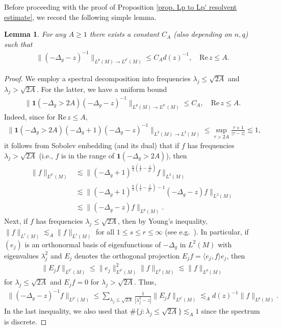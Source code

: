 \documentclass[12pt]{amsart}
\newcommand\re{\mathrm{Re}\,}
\newtheorem{lemma}[theorem]{Lemma}
\begin{document}
 Before proceeding with the proof of Proposition \ref{prop. Lp to Lp' resolvent estimate}, we record the following simple lemma. 


\begin{lemma}\label{lemma |z|<A}
For any $A\geq 1$ there exists a constant $C_A$ (also depending on $n,q$) such that
    \begin{align}
    \|(-\Delta_g-z)^{-1}\|_{L^{p}(M)\to L^{p'}(M)}\leq C_Ad(z)^{-1},\quad \re z\leq A.
\end{align}
\end{lemma}

\begin{proof}
    We employ a spectral decomposition into frequencies $\lambda_j\leq \sqrt{2A}$ and $\lambda_j>\sqrt{2A}$. For the latter, we have a uniform bound
\begin{align}
\|\mathbf{1}(-\Delta_g>2A)(-\Delta_g-z)^{-1}\|_{L^{p}(M)\to L^{p'}(M)}\leq C_A,\quad \re z\leq A.
\end{align}
Indeed, since for $\re z\leq A$,
\begin{align}
    \|\mathbf{1}(-\Delta_g>2A)(-\Delta_g+1)(-\Delta_g-z)^{-1}\|_{L^2(M)\to L^2(M)}\leq \sup_{\tau>2A}\frac{\tau+1}{|\tau-z|}\lesssim 1,
\end{align}
it follows from Sobolev embedding (and its dual)
that if $f$ has frequencies $\lambda_j>\sqrt{2A}$ (i.e., $f$ is in the range of $\mathbf{1}(-\Delta_g>2A)$), then
\begin{align}
 \|f\|_{L^{p'}(M)}
 &\lesssim \|(-\Delta_g+1)^{\frac{n}{2}(\frac{1}{2}-\frac{1}{p'})}f\|_{L^{2}(M)}\\
 &\lesssim \|(-\Delta_g+1)^{\frac{n}{2}(\frac{1}{2}-\frac{1}{p'})-1}(-\Delta_g-z)f\|_{L^{2}(M)}\\
 &\lesssim \|(-\Delta_g-z)f\|_{L^{p}(M)}.
\end{align}
Next, if $f$ has frequencies $\lambda_j\leq \sqrt{2A}$, then
by Young's inequality, $\|f\|_{L^r(M)}\lesssim_A \|f\|_{L^s(M)}$ for all $1\leq s\leq r\leq \infty$ (see e.g.\ \cite[Lemma 3.1]{MR3302640}). In particular, if $(e_j)$ is an orthonormal basis of eigenfunctions of $-\Delta_g$ in $L^2(M)$ with eigenvalues $\lambda_j^2$ and $E_j$ denotes the orthogonal projection $E_jf=\langle e_j,f\rangle e_j$, then
\begin{align}
    \|E_j f\|_{L^{p'}(M)}\leq \|e_j\|_{L^{p'}(M)}^2 \|f\|_{L^{p}(M)}\lesssim \|f\|_{L^{p}(M)}
\end{align}
for $\lambda_j\leq \sqrt{2A}$ and $E_jf=0$ for $\lambda_j>\sqrt{2A}$.
Thus,
\begin{align}
 \|(-\Delta_g-z)^{-1}f\|_{L^{p'}(M)}\leq \sum_{\lambda_j\leq \sqrt{2A}}\frac{1}{|\lambda_j^2-z|}\|E_j f\|_{L^{p'}(M)}\lesssim_A d(z)^{-1}   \|f\|_{L^{p}(M)}.
\end{align}
In the last inequality, we also used that $\#\{j:\lambda_j\leq \sqrt{2A}\}\lesssim_A 1$ since the spectrum is discrete. 
\end{proof}
\end{document}
